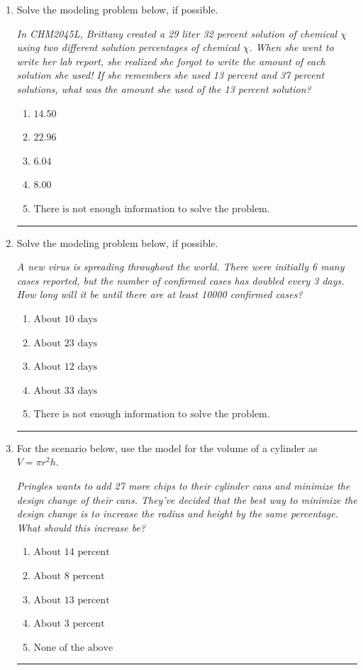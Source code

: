 \documentclass[14pt]{extbook}
\newcommand{\litem}[1]{\item#1\hspace*{-1cm}\rule{\textwidth}{0.4pt}}
\begin{document}
\begin{enumerate}
{\begin{enumerate}[label=\Alph*.]
\end{enumerate} }
\litem{
Solve the modeling problem below, if possible.
\begin{center}
    \textit{ In CHM2045L, Brittany created a 29 liter 32 percent solution of chemical $\chi$ using two different solution percentages of chemical $\chi$. When she went to write her lab report, she realized she forgot to write the amount of each solution she used! If she remembers she used 13 percent and 37 percent solutions, what was the amount she used of the 13 percent solution? }
\end{center}
\begin{enumerate}[label=\Alph*.]
\item \( 14.50 \)
\item \( 22.96 \)
\item \( 6.04 \)
\item \( 8.00 \)
\item \( \text{There is not enough information to solve the problem.} \)

\end{enumerate} }
\litem{
Solve the modeling problem below, if possible.
\begin{center}
    \textit{ A new virus is spreading throughout the world. There were initially 6 many cases reported, but the number of confirmed cases has doubled every 3 days. How long will it be until there are at least 10000 confirmed cases? }
\end{center}
\begin{enumerate}[label=\Alph*.]
\item \( \text{About } 10 \text{ days} \)
\item \( \text{About } 23 \text{ days} \)
\item \( \text{About } 12 \text{ days} \)
\item \( \text{About } 33 \text{ days} \)
\item \( \text{There is not enough information to solve the problem.} \)

\end{enumerate} }
\litem{
For the scenario below, use the model for the volume of a cylinder as $V = \pi r^2 h$.
\begin{center}
    \textit{ Pringles wants to add 27 \text{percent} more chips to their cylinder cans and minimize the design change of their cans. They've decided that the best way to minimize the design change is to increase the radius and height by the same percentage. What should this increase be? }
\end{center}
\begin{enumerate}[label=\Alph*.]
\item \( \text{About } 14 \text{ percent} \)
\item \( \text{About } 8 \text{ percent} \)
\item \( \text{About } 13 \text{ percent} \)
\item \( \text{About } 3 \text{ percent} \)
\item \( \text{None of the above} \)


\end{enumerate}}
\end{enumerate}
\end{document}
